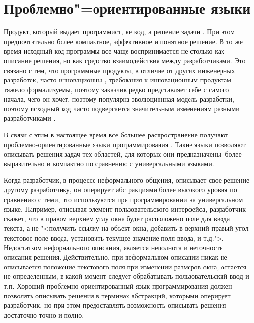 \section{Проблемно"=ориентированные языки}
Продукт, который выдает программист, не код, а решение задачи \cite{dmitriev}. При этом предпочтительно более компактное,
эффективное и понятное решение. В то же время исходный код программы все чаще воспринимается не столько как описание
решения, но как средство взаимодействия между разработчиками. Это связано с тем, что программные продукты, в отличие от
других инженерных разработок, часто инновационны \cite{brooks}, требования к инновационным продуктам тяжело формализуемы,
поэтому заказчик редко представляет себе с самого начала, чего он хочет, поэтому популярна эволюционная модель разработки,
поэтому исходный код часто подвергается значительным изменениям разными разработчиками \cite{ambler}.

В связи с этим в настоящее время все большее распространение получают проблемно-ориентированные языки программирования 
\cite{fowler01}. Такие языки позволяют описывать решения задач тех областей, для которых они предназначены, более
выразительно и компактно по сравнению с универсальными языками.

Когда разработчик, в процессе неформального общения, описывает свое решение другому разработчику, он оперирует абстракциями
более высокого уровня по сравнению с теми, что используются при программировании на универсальном языке. Например, описывая
элемент пользовательского интерфейса, разработчик скажет, что в правом верхнем углу окна будет расположено поле для ввода
текста, а не "<получить ссылку на объект окна, добавить в верхний правый угол текстовое поле ввода, установить текущее
значение поля ввода, и т.д.">. Недостатком неформального описания, является неполнота и неточность описания решения.
Действительно, при неформальном описании никак не описывается положение текстового поля при изменении размеров окна,
остается не определенным, в какой момент следует обрабатывать пользовательский ввод и т.п. Хороший проблемно-ориентированный
язык программирования должен позволять описывать решения в терминах абстракций, которыми оперирует разработчик, но при этом
предоставлять возможность описывать решения достаточно точно и полно.
